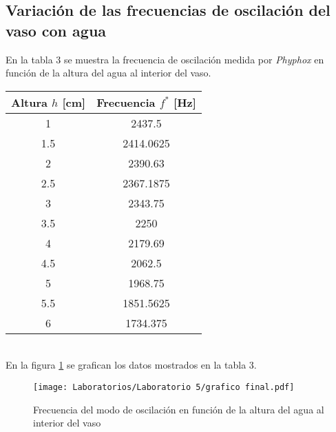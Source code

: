\documentclass[letterpaper,11pt]{article} %
\begin{document}
\subsection{Variación de las frecuencias de oscilación del vaso con agua }
En la tabla 3 se muestra la frecuencia de oscilación medida por \textit{Phyphox} en función de la altura del agua al interior del vaso. 
\begin{center}
\begin{tabular}{|c|c|}
\hline
\textbf{Altura $h$ {[}cm{]}} & \multicolumn{1}{l|}{\textbf{Frecuencia $f^*$ {[}Hz{]}}} \\ \hline
1                            & 2437.5                                                  \\ \hline
1.5                          & 2414.0625                                               \\ \hline
2                            & 2390.63                                                 \\ \hline
2.5                          & 2367.1875                                               \\ \hline
3                            & 2343.75                                                 \\ \hline
3.5                          & 2250                                                    \\ \hline
4                            & 2179.69                                                 \\ \hline
4.5                          & 2062.5                                                  \\ \hline
5                            & 1968.75                                                 \\ \hline
5.5                          & 1851.5625                                               \\ \hline
6                            & 1734.375                                                \\ \hline
\end{tabular}
\end{center}
\\
En la figura \ref{tabla} se grafican los datos mostrados en la tabla 3.
\begin{figure}
    \centering
    \texttt{[image: Laboratorios/Laboratorio 5/grafico final.pdf]}
    \caption{Frecuencia del modo de oscilación en función de la altura del agua al interior del vaso}
    \label{tabla}
\end{figure}
\end{document}
